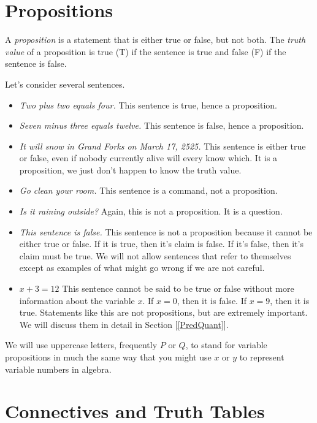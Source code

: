 \section{Propositions}

\begin{definition}
A \emph{proposition} is a statement that is either true or false, but not both.  The \emph{truth value}  of a proposition is true (T) if the sentence is true and false (F) if the sentence is false.
\end{definition}

 Let's consider several sentences.

\begin{itemize}\itemsep0pt
\item \emph{Two plus two equals four.} This sentence is true, hence a proposition.
\item \emph{Seven minus three equals twelve.} This sentence is false, hence a proposition. 
\item \emph{It will snow in Grand Forks on March 17, 2525.} This sentence is either true or false, even if nobody currently alive will every know which. It is a proposition, we just don't happen to know the truth value.
\item \emph{Go clean your room.} This sentence is a command, not a proposition.
\item \emph{Is it raining outside?} Again, this is not a proposition. It is a question.
\item \emph{This sentence is false.} This sentence is not a proposition because it cannot be either true or false. If it is true, then it's claim is false. If it's false, then it's claim must be true. We will not allow sentences that refer to themselves except as examples of what might go wrong if we are not careful.
\item \emph{$x+3=12$} This sentence cannot be said to be true or false without more information about the variable $x$. If $x=0$, then it is false. If $x=9$, then it is true. Statements like this are not propositions, but are extremely important. We will discuss them in detail in Section [\ref{PredQuant}].
\end{itemize}

We will use uppercase letters, frequently $P$ or $Q$, to stand for variable propositions in much the same way that you might use $x$ or $y$ to represent variable numbers in algebra.

\section{Connectives and Truth Tables}

